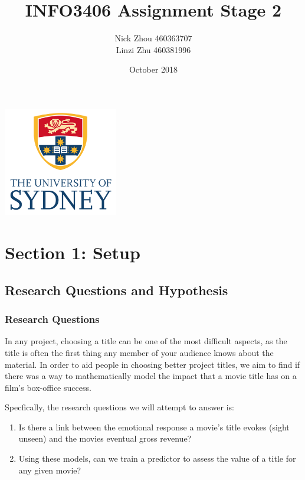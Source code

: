 \documentclass[font=10pt]{article}
\begin{document}
  \begin{titlepage}
    \centering
    \title{\textbf{INFO3406 Assignment Stage 2}}
    \author{
      Nick Zhou 460363707\\
      Linzi Zhu 460381996
    }
    \date{October 2018}
    \maketitle
    \includegraphics[width=5cm]{usyd}
  \end{titlepage}

  \begin{tableofcontents}
    \tableofcontents
  \end{tableofcontents}

  \section{Section 1: Setup}
    \subsection{Research Questions and Hypothesis}
      \subsubsection{Research Questions}

	In any project, choosing a title can be one of the most difficult aspects, as the title is often the first thing any member of your audience knows about the material. In order to aid people in choosing better project titles, we aim to find if there was a way to mathematically model the impact that a movie title has on a film's box-office success. 

      Specfically, the research questions we will attempt to answer is:
      \begin{enumerate}
        \item Is there a link between the emotional response a movie’s title evokes (sight unseen) and the movies eventual gross revenue?
        \item Using these models, can we train a predictor to assess the value of a title for any given movie?
      \end{enumerate}
\end{document}
